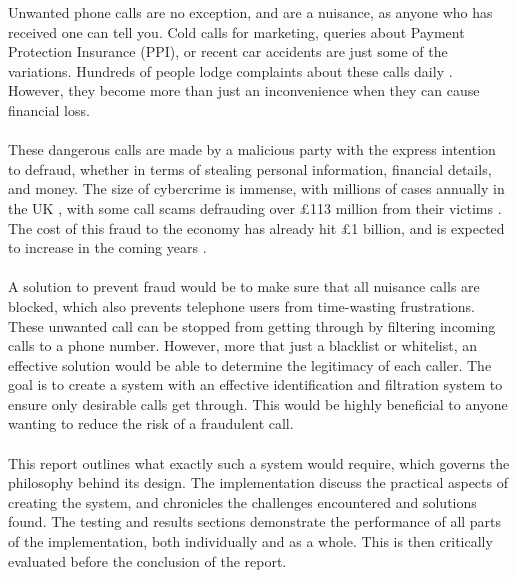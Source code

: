 Unwanted phone calls are no exception, and are a nuisance, as anyone who has received one can tell you. Cold calls for marketing, queries about Payment Protection Insurance (PPI), or recent car accidents are just some of the variations. Hundreds of people lodge complaints about these calls daily \cite{bbc-coldcalls}. However, they become more than just an inconvenience when they can cause financial loss.
\\\\
These dangerous calls are made by a malicious party with the express intention to defraud, whether in terms of stealing personal information, financial details, and money. The size of cybercrime is immense, with millions of cases annually in the UK \cite{bbc-number}, with some call scams defrauding over £113 million from their victims \cite{guardian-cost}. The cost of this fraud to the economy has already hit £1 billion, and is expected to increase in the coming years \cite{guardian-cost}.
\\\\
A solution to prevent fraud would be to make sure that all nuisance calls are blocked, which also prevents telephone users from time-wasting frustrations. These unwanted call can be stopped from getting through by filtering incoming calls to a phone number. However, more that just a blacklist or whitelist, an effective solution would be able to determine the legitimacy of each caller. The goal is to create a system with an effective identification and filtration system to ensure only desirable calls get through. This would be highly beneficial to anyone wanting to reduce the risk of a fraudulent call.
\\\\
This report outlines what exactly such a system would require, which governs the philosophy behind its design. The implementation discuss the practical aspects of creating the system, and chronicles the challenges encountered and solutions found. The testing and results sections demonstrate the performance of all parts of the implementation, both individually and as a whole. This is then critically evaluated before the conclusion of the report.
% 
